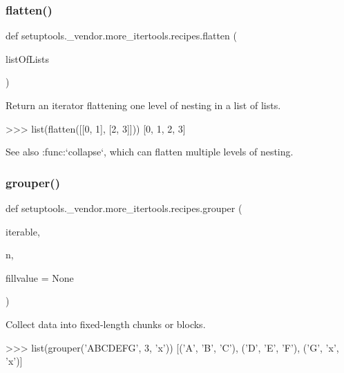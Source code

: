 \subsubsection{\texorpdfstring{flatten()}{flatten()}}
{\footnotesize\ttfamily def setuptools.\+\_\+vendor.\+more\+\_\+itertools.\+recipes.\+flatten (\begin{DoxyParamCaption}\item[{}]{list\+Of\+Lists }\end{DoxyParamCaption})}

\begin{DoxyVerb}Return an iterator flattening one level of nesting in a list of lists.

    >>> list(flatten([[0, 1], [2, 3]]))
    [0, 1, 2, 3]

See also :func:`collapse`, which can flatten multiple levels of nesting.\end{DoxyVerb}
 \mbox{\label{namespacesetuptools_1_1__vendor_1_1more__itertools_1_1recipes_a27f1353d86370c730f6aa45b61f725f9}} 
\subsubsection{\texorpdfstring{grouper()}{grouper()}}
{\footnotesize\ttfamily def setuptools.\+\_\+vendor.\+more\+\_\+itertools.\+recipes.\+grouper (\begin{DoxyParamCaption}\item[{}]{iterable,  }\item[{}]{n,  }\item[{}]{fillvalue = {\ttfamily None} }\end{DoxyParamCaption})}

\begin{DoxyVerb}Collect data into fixed-length chunks or blocks.

>>> list(grouper('ABCDEFG', 3, 'x'))
[('A', 'B', 'C'), ('D', 'E', 'F'), ('G', 'x', 'x')]\end{DoxyVerb}
 \mbox{\label{namespacesetuptools_1_1__vendor_1_1more__itertools_1_1recipes_acea9faafcad6fb77aaabd5244d001985}} 
